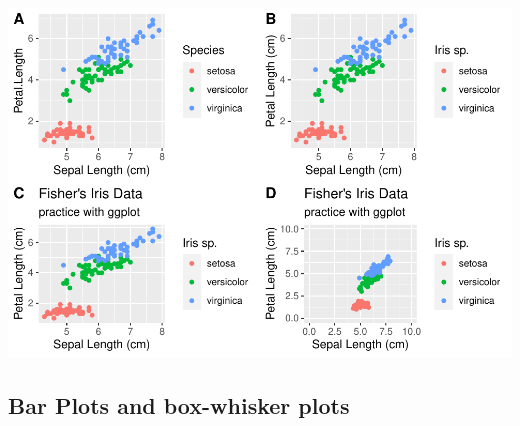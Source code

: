 \documentclass[
]{article}
\begin{document}
\includegraphics{module1_3_files/figure-latex/unnamed-chunk-13-1.pdf}

\hypertarget{bar-plots-and-box-whisker-plots}{%
\subsection{Bar Plots and box-whisker
plots}\label{bar-plots-and-box-whisker-plots}}
\end{document}
